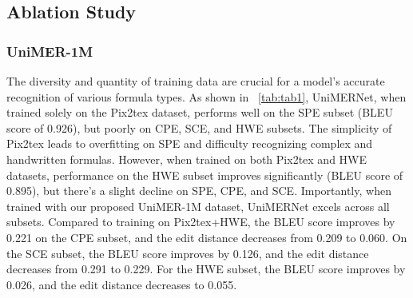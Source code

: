 \documentclass[runningheads]{llncs}
\begin{document}
\subsection{Ablation Study}

\subsubsection{UniMER-1M} 

The diversity and quantity of training data are crucial for a model's accurate recognition of various formula types. As shown in ~\cref{tab:tab1}, UniMERNet, when trained solely on the Pix2tex dataset, performs well on the SPE subset (BLEU score of 0.926), but poorly on CPE, SCE, and HWE subsets. The simplicity of Pix2tex leads to overfitting on SPE and difficulty recognizing complex and handwritten formulas. However, when trained on both Pix2tex and HWE datasets, performance on the HWE subset improves significantly (BLEU score of 0.895), but there's a slight decline on SPE, CPE, and SCE. Importantly, when trained with our proposed UniMER-1M dataset, UniMERNet excels across all subsets. Compared to training on Pix2tex+HWE, the BLEU score improves by 0.221 on the CPE subset, and the edit distance decreases from 0.209 to 0.060. On the SCE subset, the BLEU score improves by 0.126, and the edit distance decreases from 0.291 to 0.229. For the HWE subset, the BLEU score improves by 0.026, and the edit distance decreases to 0.055.
\end{document}
